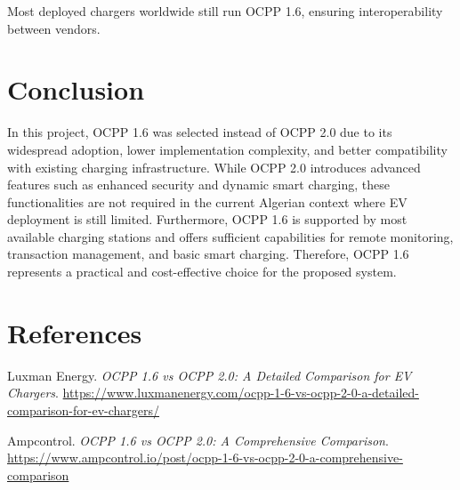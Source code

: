 \documentclass[12pt,a4paper]{report}
\begin{document}
Most deployed chargers worldwide still run OCPP 1.6, ensuring interoperability between vendors.

\section{Conclusion}

In this project, OCPP 1.6 was selected instead of OCPP 2.0 due to its widespread adoption,
lower implementation complexity, and better compatibility with existing charging infrastructure.
While OCPP 2.0 introduces advanced features such as enhanced security and dynamic smart
charging, these functionalities are not required in the current Algerian context where EV
deployment is still limited. Furthermore, OCPP 1.6 is supported by most available charging
stations and offers sufficient capabilities for remote monitoring, transaction management, and
basic smart charging. Therefore, OCPP 1.6 represents a practical and cost-effective choice for
the proposed system.

\section{References}

\begin{enumerate}[label={[\arabic*]}]
  \item Luxman Energy. \textit{OCPP 1.6 vs OCPP 2.0: A Detailed Comparison for EV Chargers}.
        \url{https://www.luxmanenergy.com/ocpp-1-6-vs-ocpp-2-0-a-detailed-comparison-for-ev-chargers/}

  \item Ampcontrol. \textit{OCPP 1.6 vs OCPP 2.0: A Comprehensive Comparison}.
        \url{https://www.ampcontrol.io/post/ocpp-1-6-vs-ocpp-2-0-a-comprehensive-comparison}
\end{enumerate}
\end{document}
